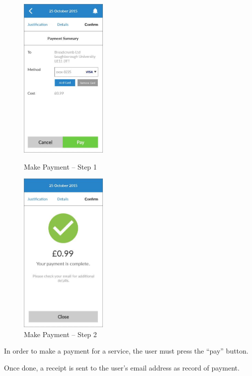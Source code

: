 \begin{figure}
  \subfigures
  \centering
  \begin{minipage}{4.6cm}
    \centering
    \includegraphics[width=4.2cm]{inc/ui_payment_mk_step1.jpg}
    \caption{Make Payment -- Step 1}
    \label{fig:ui_payment_mk_step1}
  \end{minipage}
  \begin{minipage}{4.6cm}
    \centering
    \includegraphics[width=4.2cm]{inc/ui_payment_mk_step2.jpg}
    \caption{Make Payment -- Step 2}
    \label{fig:ui_payment_mk_step2}
  \end{minipage}
\end{figure}

\begin{minipage}{\textwidth}
  \centering
  \begin{minipage}[t]{4.6cm}
    \vspace{0pt}
    \centering
    \begin{minipage}{4.4cm}
      In order to make a payment for a service, the user must press the ``pay'' button.
    \end{minipage}
  \end{minipage}
  \begin{minipage}[t]{4.6cm}
    \vspace{0pt}
    \centering
    \begin{minipage}{4.4cm}
      Once done, a receipt is sent to the user’s email address as record of payment.
    \end{minipage}
  \end{minipage}
\end{minipage}

